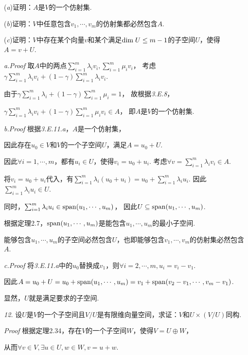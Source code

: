 (\textit{a})证明：\(A\)是\(V\)的一个仿射集.

(\textit{b})证明：\(V\)中任意包含\(v_1,\cdots,v_m\)的仿射集都必然包含\(A\).

(\textit{c})证明：\(V\)中存在某个向量\(v\)和某个满足\(\mathrm{dim \;} U \leq m-1\)的子空间\(U\)，使得\(A=v+U\).

\textit{a.Proof}
取\(A\)中的两点\(\sum_{i=1}^m \lambda_i v_i,\sum_{i=1}^m \mu_i v_i\)，
考虑\(\gamma \sum_{i=1}^m \lambda_i v_i+(1-\gamma)\sum_{i=1}^m \lambda_i v_i\).

由于\(\gamma \sum_{i=1}^m \lambda_i+(1-\gamma)\sum_{i=1}^m \mu_i=1\)，
故根据\textit{3.E.8}，

\(\gamma \sum_{i=1}^m \lambda_i v_i+(1-\gamma)\sum_{i=1}^m \mu_i v_i \in A\)，
即\(A\)是\(V\)的一个仿射集.

\textit{b.Proof}
根据\textit{3.E.11.a}，\(A\)是一个仿射集，

因此存在\(u_0 \in V\)和\(V\)的一个子空间\(U\)，满足\(A=u_0+U\).

因此\(\forall i=1,\cdots,m\)，都有\(u_i \in U\)，使得\(v_i=u_0+u_i\).
考虑\(\forall v=\sum_{i=1}^m \lambda_i v_i \in A\).

将\(v_i=u_0+u_i\)代入，有\(\sum_{i=1}^m \lambda_i(u_0+u_i)=u_0+\sum_{i=1}^m \lambda_i u_i\).
因此\(\sum_{i=1}^m \lambda_i u_i \in U\).

同时，\(\sum_{i=1}^m \lambda_i u_i \in \mathrm{span} (u_1,\cdots,u_m)\)，
因此\(U \subseteq \mathrm{span} (u_1,\cdots,u_m)\).

根据定理2.7，\(\mathrm{span} (u_1,\cdots,u_m)\)是能包含\(u_1,\cdots,u_m\)的最小子空间.

能够包含\(u_1,\cdots,u_m\)的子空间必然包含\(U\)，也即能够包含\(v_1,\cdots,v_m\)的仿射集必然包含\(A\).

\textit{c.Proof}
将\textit{3.E.11.a}中的\(u_0\)替换成\(v_1\)，则\(\forall i=2,\cdots,m,u_i=v_i-v_1\).

因此\(A=u_0+U=u_0+\mathrm{span} (u_1,\cdots,u_m)=v_1+\mathrm{span} (v_2-v_1,\cdots,v_m-v_1)\).

显然，\(U\)就是满足要求的子空间.

\hspace*{\fill}

\textit{12.}
设\(U\)是\(V\)的一个子空间且\(V/U\)是有限维向量空间，求证：\(V\)和\(U \times (V/U)\)同构.

\textit{Proof}
根据定理2.34，存在\(V\)的一个子空间\(W\)，使得\(V=U \oplus W\)，

从而\(\forall v \in V, \exists u \in U,w \in W,v=u+w\).

